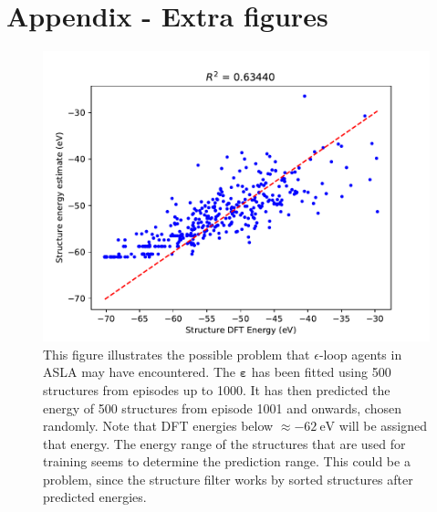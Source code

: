 \newpage
\chapter{Appendix - Extra figures}

\begin{figure}[ht]
	\includegraphics[width=\columnwidth]{graphics/energy_prediction_low_energy.pdf}
	\caption{This figure illustrates the possible problem that $\epsilon$-loop agents in ASLA may have encountered. The $\bm{\varepsilon}$ has been fitted using 500 structures from episodes up to 1000. It has then predicted the energy of 500 structures from episode 1001 and onwards, chosen randomly. Note that DFT energies below $\approx \SI{-62}{\electronvolt}$ will be assigned that energy. The energy range of the structures that are used for training seems to determine the prediction range. This could be a problem, since the structure filter works by sorted structures after predicted energies.}
	\label{fig:App_low_energy_predicts}
\end{figure}

\newpage
\thispagestyle{empty}

